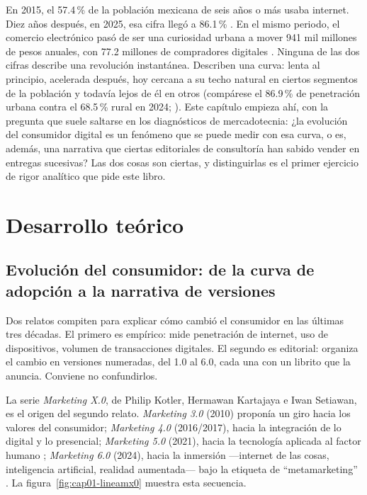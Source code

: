 En 2015, el 57.4\,\% de la población mexicana de seis años o más usaba
internet. Diez años después, en 2025, esa cifra llegó a 86.1\,\%
\parencite{inegi2026endutih}. En el mismo periodo, el comercio electrónico
pasó de ser una curiosidad urbana a mover 941 mil millones de pesos anuales,
con 77.2 millones de compradores digitales \parencite{amvo2026}. Ninguna de
las dos cifras describe una revolución instantánea. Describen una curva:
lenta al principio, acelerada después, hoy cercana a su techo natural en
ciertos segmentos de la población y todavía lejos de él en otros (compárese
el 86.9\,\% de penetración urbana contra el 68.5\,\% rural en 2024;
\parencite{inegi2025endutih}). Este capítulo empieza ahí, con la pregunta que
suele saltarse en los diagnósticos de mercadotecnia: ¿la evolución del
consumidor digital es un fenómeno que se puede medir con esa curva, o es,
además, una narrativa que ciertas editoriales de consultoría han sabido
vender en entregas sucesivas? Las dos cosas son ciertas, y distinguirlas es
el primer ejercicio de rigor analítico que pide este libro.

\section{Desarrollo teórico}

\subsection{Evolución del consumidor: de la curva de adopción a la narrativa de versiones}

Dos relatos compiten para explicar cómo cambió el consumidor en las últimas
tres décadas. El primero es empírico: mide penetración de internet, uso de
dispositivos, volumen de transacciones digitales. El segundo es editorial:
organiza el cambio en versiones numeradas, del 1.0 al 6.0, cada una con un
librito que la anuncia. Conviene no confundirlos.

La serie \textit{Marketing X.0}, de Philip Kotler, Hermawan Kartajaya e Iwan
Setiawan, es el origen del segundo relato. \textit{Marketing 3.0} (2010)
proponía un giro hacia los valores del consumidor; \textit{Marketing 4.0}
(2016/2017), hacia la integración de lo digital y lo presencial;
\textit{Marketing 5.0} (2021), hacia la tecnología aplicada al factor humano
\parencite{kotler2021marketing50}; \textit{Marketing 6.0} (2024), hacia la
inmersión —internet de las cosas, inteligencia artificial, realidad
aumentada— bajo la etiqueta de \enquote{metamarketing} \parencite{kotler2024marketing6}.
La figura~\ref{fig:cap01-lineamx0} muestra esta secuencia.

